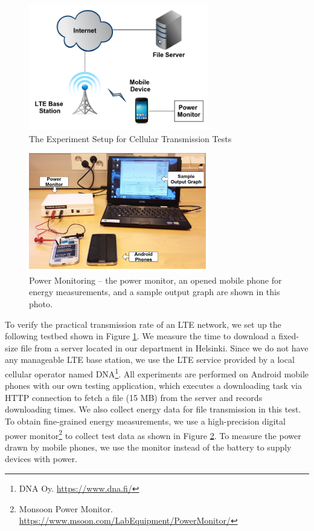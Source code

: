 \documentclass[english]{tktltiki}
\begin{document}
\begin{figure}[htbp]
  \centering
  \includegraphics[width=0.7\textwidth]{images/cellular-test.png}
  \caption{The Experiment Setup for Cellular Transmission Tests}
  \label{fig:cellular-test}
\end{figure}

\begin{figure}[htbp]
  \centering
  \includegraphics[width=0.7\textwidth]{images/power-monitor.jpg}
  \caption{Power Monitoring -- the power monitor, an opened mobile phone for energy measurements, and a sample output graph are shown in this photo.}
  \label{fig:power-monitor}
\end{figure}


To verify the practical transmission rate of an LTE network, we set up the following testbed shown in Figure \ref{fig:cellular-test}. We measure the time to download a fixed-size file from a server located in our department in Helsinki. Since we do not have any manageable LTE base station, we use the LTE service provided by a local cellular operator named DNA\footnote{DNA Oy. \url{https://www.dna.fi/}}. All experiments are performed on Android mobile phones with our own testing application, which executes a downloading task via HTTP connection to fetch a file (15 MB) from the server and records downloading times. We also collect energy data for file transmission in this test. To obtain fine-grained energy measurements, we use a high-precision digital power monitor\footnote{Monsoon Power Monitor. \url{https://www.msoon.com/LabEquipment/PowerMonitor/}} to collect test data as shown in Figure \ref{fig:power-monitor}. To measure the power drawn by mobile phones, we use the monitor instead of the battery to supply devices with power.
\end{document}
